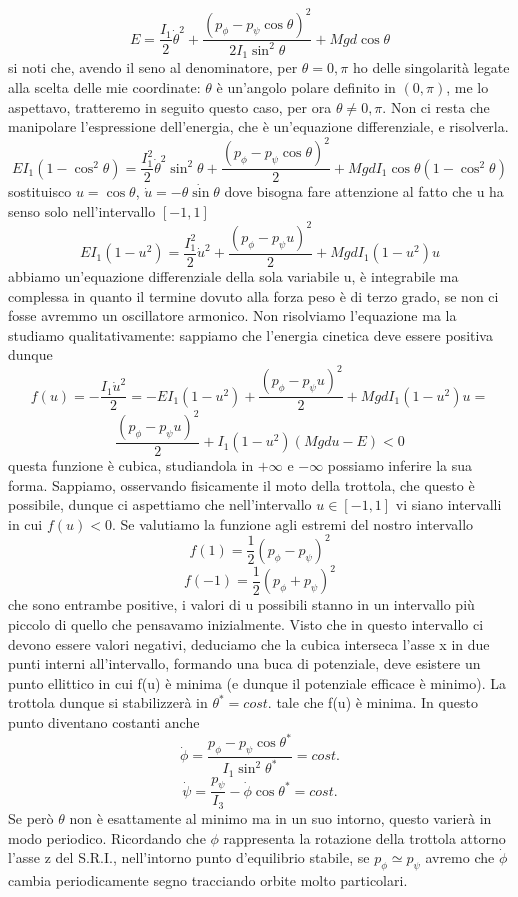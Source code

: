 \documentclass[
10pt, %
a4paper, %
oneside, %
headinclude,footinclude, %
BCOR5mm, %
]{scrartcl}
\begin{document}
\[E = \frac{I_1}{2}\dot{\theta}^2+\frac{(p_\phi-p_\psi\cos\theta)^2}{2I_1\sin^2\theta}+Mgd\cos\theta\] 
si noti che, avendo il seno al denominatore, per \(\theta = 0, \pi\) ho delle singolarità legate alla scelta delle mie coordinate: \(\theta\) è un'angolo polare definito in \((0, \pi)\), me lo aspettavo, tratteremo in seguito questo caso, per ora \(\theta\neq 0, \pi\). Non ci resta che manipolare l'espressione dell'energia, che è un'equazione differenziale, e risolverla.
\[EI_1(1-\cos^2\theta)= \frac{I_1^2}{2}\dot{\theta}^2\sin^2\theta+\frac{(p_\phi-p_\psi\cos\theta)^2}{2}+MgdI_1\cos\theta(1-\cos^2\theta)\]
sostituisco \(u = \cos\theta\), \(\dot{u} = -\dot{\theta\sin\theta}\) dove bisogna fare attenzione al fatto che u ha senso solo nell'intervallo \([-1, 1]\)
\[EI_1(1-u^2)= \frac{I_1^2}{2}\dot{u}^2+\frac{(p_\phi-p_\psi u)^2}{2}+MgdI_1(1-u^2)u\]
abbiamo un'equazione differenziale della sola variabile u, è integrabile ma complessa in quanto il termine dovuto alla forza peso è di terzo grado, se non ci fosse avremmo un oscillatore armonico. Non risolviamo l'equazione ma la studiamo qualitativamente: sappiamo che l'energia cinetica deve essere positiva dunque
\[f(u) = -\frac{I_1\dot{u}^2}{2} = -EI_1(1-u^2)+\frac{(p_\phi-p_\psi u)^2}{2}+MgdI_1(1-u^2)u =  \]
\[\frac{(p_\phi-p_\psi u)^2}{2}+I_1(1-u^2)(Mgdu-E)<0\]
questa funzione è cubica, studiandola in \(+\infty\) e $-\infty$ possiamo inferire la sua forma. Sappiamo, osservando fisicamente il moto della trottola, che questo è possibile, dunque ci aspettiamo che nell'intervallo \(u\in[-1, 1]\) vi siano intervalli in cui \(f(u)<0\). Se valutiamo la funzione agli estremi del nostro intervallo
\[f(1) = \frac{1}{2}(p_\phi-p_\psi)^2\]
\[f(-1) = \frac{1}{2}(p_\phi+p_\psi)^2\]
che sono entrambe positive, i valori di u possibili stanno in un intervallo più piccolo di quello che pensavamo inizialmente. Visto che in questo intervallo ci devono essere valori negativi, deduciamo che la cubica interseca l'asse x in due punti interni all'intervallo, formando una buca di potenziale, deve esistere un punto ellittico in cui f(u) è minima (e dunque il potenziale efficace è minimo). La trottola dunque si stabilizzerà in $\theta^* = cost.$ tale che f(u) è minima. In questo punto diventano costanti anche
\[\dot{\phi} = \frac{p_\phi-p_\psi\cos\theta^*}{I_1\sin^2\theta^*} = cost.\]
\[\dot{\psi} = \frac{p_\psi}{I_3}-\dot{\phi}\cos\theta^* = cost.\]
Se però $\theta$ non è esattamente al minimo ma in un suo intorno, questo varierà in modo periodico. Ricordando che $\phi$ rappresenta la rotazione della trottola attorno l'asse z del S.R.I., nell'intorno punto d'equilibrio stabile, se \(p_\phi\simeq p_\psi\) avremo che $\dot{\phi}$ cambia periodicamente segno tracciando orbite molto particolari.\\
\end{document}
